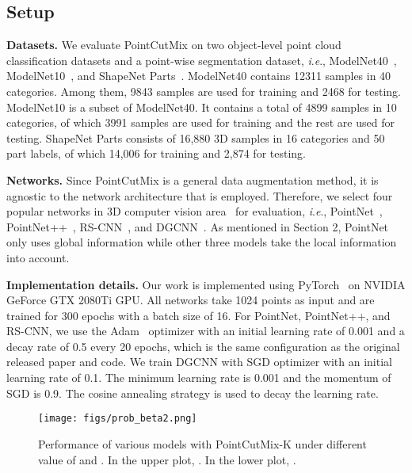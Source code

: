 \documentclass{article}
\newcommand{\ie}{\textit{i}.\textit{e}.}
\begin{document}
\subsection{Setup}

\textbf{Datasets.} 
We evaluate PointCutMix on two object-level point cloud classification datasets and a point-wise segmentation dataset, \ie, ModelNet40~\cite{modelnet40}, ModelNet10~\cite{modelnet40}, and ShapeNet Parts~\cite{shapepartseg}. 
ModelNet40 contains 12311 samples in 40 categories. Among them, 9843 samples are used for training and 2468 for testing. 
ModelNet10 is a subset of ModelNet40. It contains a total of 4899 samples in 10 categories, of which 3991 samples are used for training and the rest are used for testing.
ShapeNet Parts consists of 16,880 3D samples in 16 categories and 50 part labels, of which 14,006 for training and 2,874 for testing.

\textbf{Networks.} Since PointCutMix is a general data augmentation method, it is agnostic to the network architecture that is employed. Therefore, we select four popular networks in 3D computer vision area~\cite{pointaugment,isometry3d} for evaluation, \ie, PointNet~\cite{pointnet}, PointNet++~\cite{pointnet++}, RS-CNN~\cite{rscnn}, and DGCNN~\cite{dgcnn}. As mentioned in Section 2, PointNet only uses global information while other three models take the local information into account.


\textbf{Implementation details.} Our work is implemented using PyTorch~\cite{torch} on NVIDIA GeForce GTX 2080Ti GPU. All networks take 1024 points as input and are trained for 300 epochs with a batch size of 16. For PointNet, PointNet++, and RS-CNN, we use the Adam~\cite{kingma2014adam} optimizer with an initial learning rate of 0.001 and a decay rate of 0.5 every 20 epochs, which is the same configuration as the original released paper and code. We train DGCNN with SGD optimizer with an initial learning rate of 0.1. The minimum learning rate is 0.001 and the momentum of SGD is 0.9. The cosine annealing strategy is used to decay the learning rate.




\begin{figure}[t]
\vskip 0.2in
\begin{center}
\centerline{\texttt{[image: figs/prob\_beta2.png]}}
\caption{Performance of various models with PointCutMix-K under different value of  and . In the upper plot, . In the lower plot, .}
\label{prob_beta}
\end{center}
\vskip -0.2in
\end{figure}
\end{document}
